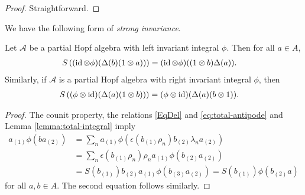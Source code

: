 \begin{proof}
  Straightforward.
\end{proof}

We have the following form of \emph{strong invariance}.

\begin{Lem} \label{lemma:strong-invariance}
  Let $\mathscr{A}$ be a partial Hopf algebra with left invariant integral $\phi$. Then
  for all $a\in A$,
  \begin{align*}
    S\left(( \operatorname{id}\otimes
    \phi)(\Delta(b)(1 \otimes a))\right) &= (\operatorname{id} \otimes \phi)((1 \otimes b)\Delta(a)).
  \end{align*}
  Similarly, if $\mathscr{A}$ is a partial Hopf algebra with right invariant integral $\phi$, then 
   \begin{align*} S\left((\phi \otimes
    \operatorname{id})(\Delta(a)(1\otimes b))\right) &= (\phi \otimes \operatorname{id})(\Delta(a)(b \otimes 1)).\end{align*}
\end{Lem}
\begin{proof}
 The counit property, the relations \eqref{EqDel} and
 \eqref{eq:total-antipode} and Lemma \ref{lemma:total-integral} imply
  \begin{align*}
    a_{(1)}\phi(ba_{(2)}) &= \sum_{n}
    a_{(1)}\phi(\epsilon(b_{(1)}\rho_{n})b_{(2)}\lambda_{n}a_{(2)}) \\
&= \sum_{n} \epsilon(b_{(1)}\rho_{n})\rho_{n}a_{(1)}\phi(b_{(2)}a_{(2)})
\\
&= S(b_{(1)})b_{(2)}a_{(1)}\phi(b_{(3)}a_{(2)}) =
S(b_{(1)})\phi(b_{(2)}a)
  \end{align*}
for all $a,b \in A$. The second equation 
follows similarly.
\end{proof}



